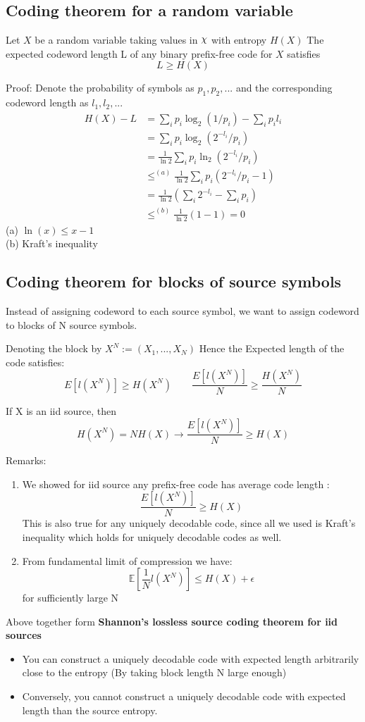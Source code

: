 \documentclass[12pt]{article}
\DeclareRobustCommand{\rchi}{{\mathpalette\irchi\relax}}
\newcommand{\irchi}[2]{\raisebox{\depth}{$#1\chi$}} %
\begin{document}
\subsection{Coding theorem for a random variable}
Let $X$ be a random variable taking values in $\rchi$ with entropy $H(X)$ The expected codeword length L of any binary prefix-free code for $X$ satisfies 
$$ L \ge H(X)$$

Proof: Denote the probability of symbols as $p_1, p_2,...$ and the corresponding codeword length as $\mathit{l}_1, \mathit{l}_2,...$
\begin{align*}
H(X) - L & = \sum_{i}p_i \log_2(1/p_i) - \sum_{i}p_i \mathit{l}_i \\ 
& = \sum_{i}p_i \log_2(2^{-\mathit{l}_i}/p_i)\\
& = \frac{1}{\ln 2} \sum_{i}p_i \ln_2(2^{-\mathit{l}_i}/p_i)\\
& \le^{(a)} \frac{1}{\ln 2} \sum_{i}p_i \left(2^{-\mathit{l}_i}/p_i -1\right) \\
& = \frac{1}{\ln 2} \left( \sum_{i}2^{-\mathit{l}_i} - \sum_{i}p_i \right) \\
& \le^{(b)} \frac{1}{\ln 2}(1 -1 )=0
\end{align*}
(a) $ \ln(x) \le x-1$ \\
(b) Kraft's inequality
\subsection{Coding theorem for blocks of source symbols}
Instead of assigning codeword to each source symbol, we want to assign codeword to blocks of N source symbols. 

Denoting the block by $X^N := (X_1,...,X_N)$ Hence the Expected length of the code satisfies:
$$E[\mathit{l}(X^N)] \ge H(X^N) \qquad  \frac{E[\mathit{l}(X^N)]}{N} \ge \frac{H(X^N)}{N}$$

If X is an iid source, then 
$$H(X^N) = NH(X) \rightarrow \frac{E[\mathit{l}(X^N)]}{N} \ge   H(X)$$

Remarks:
\begin{enumerate}
\item We showed for iid source any prefix-free code has average code length :
$$\frac{E[\mathit{l}(X^N)]}{N} \ge   H(X)$$
This is also true for any uniquely decodable code, since all we used is Kraft's inequality which holds for uniquely decodable codes as well.
\item From fundamental limit of compression we have:
$$\mathbb{E}[\frac{1}{N}\mathit{l}(X^N)] \le H(X) + \epsilon$$
for sufficiently large N
\end{enumerate}
Above together form \textbf{Shannon's lossless source coding theorem for iid sources}
\begin{itemize}
\item You can construct a uniquely decodable code with expected length arbitrarily close to the entropy (By taking block length N large enough)
\item Conversely, you cannot construct a uniquely decodable code with expected length than the source entropy.
\end{itemize}
\end{document}
